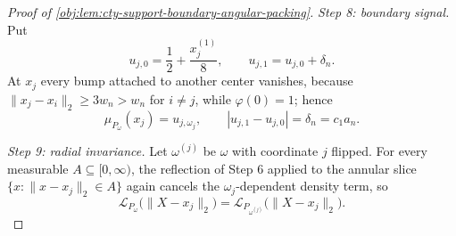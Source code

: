 \documentclass[11pt]{article}
\begin{document}
\begin{proof}[Proof of \cref{obj:lem:cty-support-boundary-angular-packing}]
\emph{Step 8: boundary signal.}  Put
\[
u_{j,0}=\frac12+\frac{x_j^{(1)}}{8},
\qquad
u_{j,1}=u_{j,0}+\delta_n .
\]
At \(x_j\) every bump attached to another center vanishes, because \(\lVert x_j-x_i\rVert_2\ge3w_n>w_n\) for \(i\ne j\), while \(\varphi(0)=1\); hence
\[
\mu_{P_\omega}(x_j)=u_{j,\omega_j},
\qquad
|u_{j,1}-u_{j,0}|=\delta_n=c_1a_n .
\]

\emph{Step 9: radial invariance.}  Let \(\omega^{(j)}\) be \(\omega\) with coordinate \(j\) flipped.  For every measurable \(A\subseteq[0,\infty)\), the reflection of Step 6 applied to the annular slice \(\{x:\lVert x-x_j\rVert_2\in A\}\) again cancels the \(\omega_j\)-dependent density term, so
\[
\mathcal L_{P_\omega}\bigl(\lVert X-x_j\rVert_2\bigr)
=
\mathcal L_{P_{\omega^{(j)}}}\bigl(\lVert X-x_j\rVert_2\bigr).
\]


\end{proof}
\end{document}
